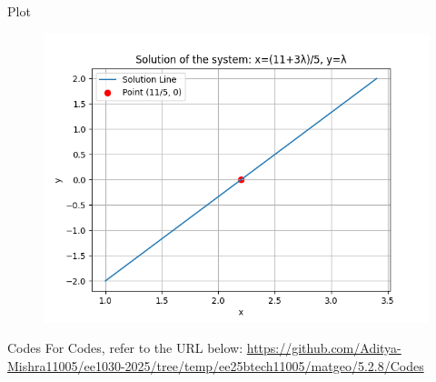 \documentclass{beamer}
\begin{document}
\begin{frame}{Plot}
\begin{figure}
    \centering
    \includegraphics[width=0.8\columnwidth]{Figs/Figure_1.png}
\end{figure}
\end{frame}

\begin{frame}{Codes}
\centering
For Codes, refer to the URL below:  
\url{https://github.com/Aditya-Mishra11005/ee1030-2025/tree/temp/ee25btech11005/matgeo/5.2.8/Codes}
\end{frame}
\end{document}
